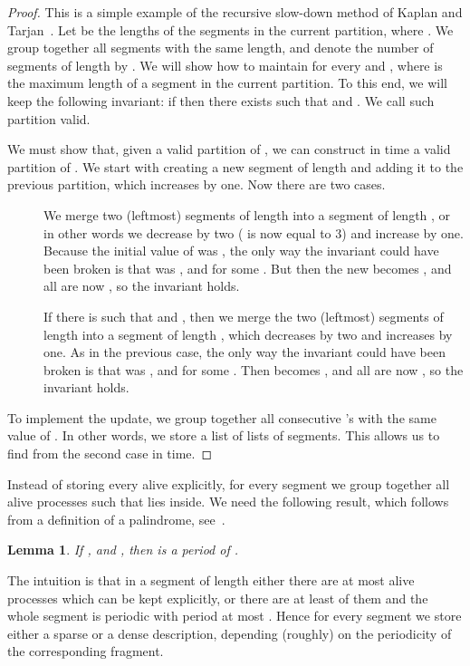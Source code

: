 \documentclass{article}[11pt,letter]
\newtheorem{lemma}[definition]{Lemma}
\begin{document}
\begin{proof}
This is a simple example of the recursive slow-down method of Kaplan and Tarjan~\cite{KaplanSlowdown}.
Let  be the lengths of the segments in the current partition, where .
We group together all segments with the same length, and denote the number of segments of length  by .
We will show how to maintain  for every  and ,
where  is the maximum length of a segment
in the current partition. To this end, we will keep the following invariant: if  then there exists  such that  
and . We call such partition valid.

We must show that, given a valid partition of , we
can construct in  time a valid partition of . We start with creating a new segment of length  and adding it to the
previous partition, which increases  by one. Now there are two cases.

\begin{description}
\item[] We merge two (leftmost) segments of length  into a segment of length , or in other words
we decrease  by two ( is now equal to 3) and increase  by one. Because the initial value of  was , the only way the invariant could have been
broken is that  was ,  and  for some . But then the new  becomes ,
and all  are now , so the invariant holds.
\item[] If there is  such that  and , then we merge the two
(leftmost) segments of length  into a segment of length , which decreases  by two and increases  by one.
As in the previous case, the only way the invariant could have been broken is that  was , 
and  for some . Then  becomes , and all  are now , so the invariant holds.
\end{description}

To implement the update, we group together all consecutive 's with the same value of . In other words, we store a list of lists of segments.
This allows us to find  from the second case in  time.
\end{proof}

Instead of storing every alive  explicitly, for every segment we group together all alive processes such that  lies inside.
We need the following result, which follows from a definition of a palindrome, see~\cite{Apostolico}.

\begin{lemma}
\label{lemma:periodicity}
If ,  and , then  is a period of .
\end{lemma}

The intuition is that in a segment of length  either there are at most  alive processes which can be kept explicitly,
or there are at least  of them and the whole segment is periodic with period at 
most . Hence for every segment we store either a sparse or a dense description, depending (roughly) on the periodicity of
the corresponding fragment.
\end{document}
